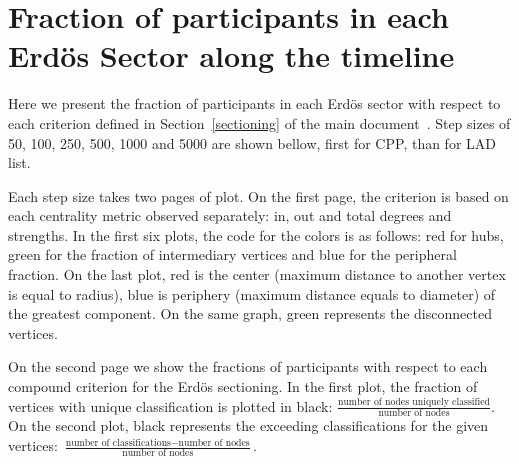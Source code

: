 \documentclass[%
 aip,
 jmp,%
 amsmath,amssymb,
 reprint,%
 floatfix,
]{revtex4-1}
\begin{document}
\section{Fraction of participants in each Erd\"os Sector along the timeline}\label{si:frac}
	Here we present the fraction of participants in each Erd\"os sector with respect to each criterion defined in Section~\ref{sectioning} of the main document~\cite{tpaper}. Step sizes of 50, 100, 250, 500, 1000 and 5000 are shown bellow, first for CPP, than for  LAD list.

							Each step size takes two pages of plot. On the first page, the criterion is based on each centrality metric observed separately: in, out and total degrees and strengths. In the first six plots, the code for the colors is as follows: red for hubs, green for the fraction of intermediary vertices and blue for the peripheral fraction. On the last plot, red is the center (maximum distance to another vertex is equal to radius), blue is periphery (maximum distance equals to diameter) of the greatest component. On the same graph, green represents the disconnected vertices.

							On the second page we show the fractions of participants with respect to each compound criterion for the Erd\"os sectioning. In the first plot, the fraction of vertices with unique classification is plotted in black: $\frac{\text{number of nodes uniquely classified}}{\text{number of nodes}}$. On the second plot, black represents the exceeding classifications for the given vertices: $\frac{\text{number of classifications} - \text{number of nodes}}{\text{number of nodes}}$.
\end{document}
